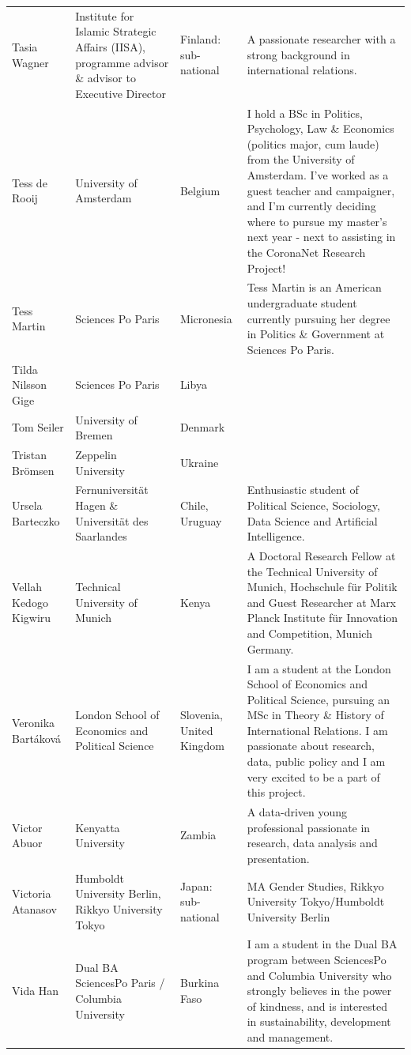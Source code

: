 \documentclass[]{article}
\begin{document}
\begin{longtable}{l>{\raggedright\arraybackslash}p{2cm}>{\raggedright\arraybackslash}p{2cm}>{\raggedright\arraybackslash}p{3cm}}
\addlinespace
\rowcolor{gray!6}  Tasia Wagner & Institute for Islamic Strategic Affairs (IISA),  programme advisor \& advisor to Executive Director & Finland: sub-national & A passionate researcher with a strong background in international relations.\\
Tess de Rooij & University of Amsterdam & Belgium & I hold a BSc in Politics, Psychology, Law \& Economics (politics major, cum laude) from the University of Amsterdam. I've worked as a guest teacher and campaigner, and I'm currently deciding where to pursue my master's next year - next to assisting in the CoronaNet Research Project!\\
\rowcolor{gray!6}  Tess Martin & Sciences Po Paris & Micronesia & Tess Martin is an American undergraduate student currently pursuing her degree in Politics \& Government at Sciences Po Paris.\\
Tilda Nilsson Gige & Sciences Po Paris & Libya & \\
\rowcolor{gray!6}  Tom Seiler & University of Bremen & Denmark & \\
\addlinespace
Tristan Brömsen & Zeppelin University & Ukraine & \\
\rowcolor{gray!6}  Ursela Barteczko & Fernuniversität Hagen \& Universität des Saarlandes & Chile, Uruguay & Enthusiastic student of Political Science, Sociology, Data Science and Artificial Intelligence.\\
Vellah Kedogo Kigwiru & Technical University of Munich & Kenya & A Doctoral Research Fellow at the Technical University of Munich, Hochschule für Politik and Guest Researcher at Marx Planck Institute für Innovation and Competition, Munich Germany.\\
\rowcolor{gray!6}  Veronika Bartáková & London School of Economics and Political Science & Slovenia, United Kingdom & I am a student at the London School of Economics and Political Science, pursuing an MSc in Theory \& History of International Relations. I am passionate about research, data, public policy and I am very excited to be a part of this project.\\
Victor Abuor & Kenyatta University & Zambia & A data-driven young professional passionate in research, data analysis and presentation.\\
\addlinespace
\rowcolor{gray!6}  Victoria Atanasov & Humboldt University Berlin, Rikkyo University Tokyo & Japan: sub-national & MA Gender Studies, Rikkyo University Tokyo/Humboldt University Berlin\\
Vida Han & Dual BA SciencesPo Paris / Columbia University & Burkina Faso & I am a student in the Dual BA program between SciencesPo and Columbia University who strongly believes in the power of kindness, and is interested in sustainability, development and management.\\

\end{longtable}
\end{document}
